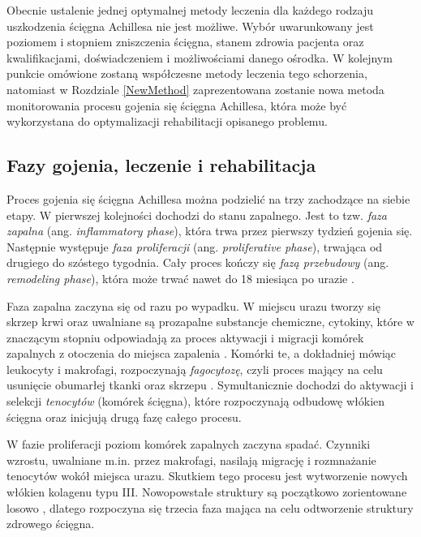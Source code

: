 Obecnie ustalenie jednej optymalnej metody leczenia dla każdego rodzaju uszkodzenia ścięgna Achillesa nie jest możliwe. Wybór uwarunkowany jest poziomem \linebreak i stopniem zniszczenia ścięgna, stanem zdrowia pacjenta oraz kwalifikacjami, doświadczeniem i możliwościami danego ośrodka. W kolejnym punkcie omówione zostaną współczesne metody leczenia tego schorzenia, natomiast w Rozdziale \ref{NewMethod} zaprezentowana zostanie nowa metoda monitorowania procesu gojenia się ścięgna Achillesa, która może być wykorzystana do optymalizacji rehabilitacji opisanego problemu. 

\subsection{Fazy gojenia, leczenie i rehabilitacja}
\label{gojenie}

Proces gojenia się ścięgna Achillesa można podzielić na trzy zachodzące na siebie etapy. W pierwszej kolejności dochodzi do stanu zapalnego. Jest to tzw. \textit{faza zapalna} (ang. \textit{inflammatory phase}), która trwa przez pierwszy tydzień gojenia się. Następnie występuje \textit{faza proliferacji} (ang. \textit{proliferative phase}), trwająca od drugiego \linebreak do szóstego tygodnia. Cały proces kończy się \textit{fazą przebudowy} (ang. \textit{remodeling phase}), która może trwać nawet do 18 miesiąca po urazie \cite{Sharma2006, Yang2013, Docheva2015, CMC}. 

Faza zapalna zaczyna się od razu po wypadku. W miejscu urazu tworzy się skrzep krwi oraz uwalniane są prozapalne substancje chemiczne, cytokiny, które \linebreak w znaczącym stopniu odpowiadają za proces aktywacji i migracji komórek zapalnych z otoczenia do miejsca zapalenia \cite{Lin2004}. Komórki te, a dokładniej mówiąc leukocyty \linebreak i makrofagi, rozpoczynają \textit{fagocytozę}, czyli proces mający na celu usunięcie obumarłej tkanki oraz skrzepu \cite{Yang2013, Beredjiklian2003, Lin2004}. Symultanicznie dochodzi do aktywacji i selekcji \textit{tenocytów} (komórek ścięgna), które rozpoczynają odbudowę włókien ścięgna \cite{Yang2013} oraz inicjują drugą fazę całego procesu.

W fazie proliferacji poziom komórek zapalnych zaczyna spadać. Czynniki wzrostu, uwalniane m.in. przez makrofagi, nasilają migrację i rozmnażanie tenocytów wokół miejsca urazu. Skutkiem tego procesu jest wytworzenie nowych włókien kolagenu typu III. Nowopowstałe struktury są początkowo zorientowane losowo \cite{Yang2013, Beredjiklian2003, Docheva2015}, dlatego rozpoczyna się trzecia faza mająca na celu odtworzenie struktury zdrowego ścięgna.

